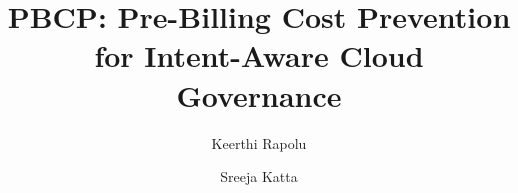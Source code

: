 \documentclass[sigconf,nonacm]{acmart}
\begin{document}
\title{PBCP: Pre-Billing Cost Prevention for Intent-Aware Cloud Governance}

\author{Keerthi Rapolu}
\author{Sreeja Katta}

\begin{abstract}

\end{abstract}

\maketitle












\end{document}
